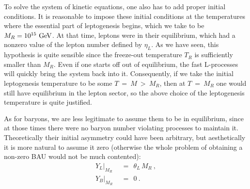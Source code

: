 \documentclass[12pt]{revtex4}
\newcommand{\GeV}{{\rm GeV}}
\begin{document}
	To solve the system of kinetic equations, one also has to 
	add proper initial conditions.
	It is reasonable to impose these initial conditions at the temperatures
	where the essential part of leptogenesis begins, which we
	take to be $ M_R = 10^{15}~\GeV $.
	At that time, leptons were in their equilibrium, which
	had a nonzero value of the lepton number defined by $ \eta_L $.
	As we have seen, this hypothesis is quite sensible since 
	the freeze-out temperature $ T_R $ is sufficiently smaller than
	$ M_R $.
	Even if one starts off out of equilibrium, the fast L-processes
	will quickly bring the system back into it.
	Consequently, if we take the initial leptogenesis temperature
	to be some $ T ~=~ M ~>~ M_R $, then at $ T~=~M_R $ one would
	still have equilibrium in the lepton sector, so the above
	choice of the leptogenesis temperature is quite justified.

	As for baryons, we are less legitimate to assume them to be in
	equilibrium, since at those times there were no baryon number
	violating processes to maintain it.
	Theoretically their initial asymmetry could have been arbitrary,
	but aesthetically it is more natural to assume it zero
	(otherwise the whole problem of obtaining a non-zero BAU would
	not be much contented):
\begin{align*}
	Y_L\bigl|_{M_R} & ~~=~~ \theta_L\, M_R~, \\
	Y_B\bigl|_{M_R} & ~~=~~ 0~.
\end{align*}
	
\end{document}
